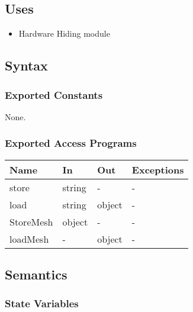 \documentclass[12pt, titlepage]{article}
\begin{document}
\subsection{Uses}
\begin{itemize}
\item Hardware Hiding module
\end{itemize}

\subsection{Syntax}

\subsubsection{Exported Constants}
None.
\subsubsection{Exported Access Programs}

\begin{center}
\begin{tabular}{p{2cm} p{4cm} p{4cm} p{2cm}}
	\hline
	\textbf{Name} & \textbf{In} & \textbf{Out} & \textbf{Exceptions} \\
	\hline
	store & string & - & - \\
	load & string & object & -\\
	StoreMesh & object & - & - \\
	loadMesh & - & object& - \\
	\hline
\end{tabular}
\end{center}

\subsection{Semantics}

\subsubsection{State Variables}
\end{document}
